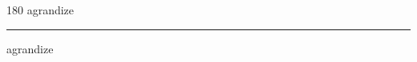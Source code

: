 
\begin{frame}
\begin{center}
\begin{turn}{180}
{\fontsize{2.5cm}{1em}\selectfont agrandize}
\end{turn}
\vspace{1em}\par  
\hrule
\vspace{1em}\par  
{\fontsize{2.5cm}{1em}\selectfont agrandize}
\end{center}
\end{frame}
